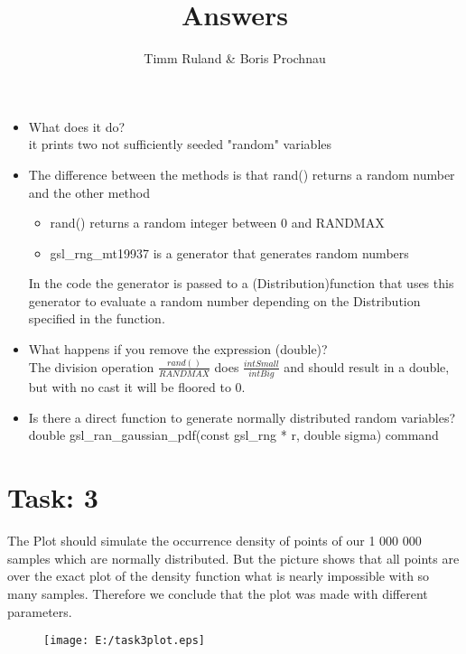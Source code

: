 \documentclass{article}
\title{Answers}
\author{Timm Ruland \& Boris Prochnau}
\begin{document}
\maketitle

\begin{itemize}
\section{Task: 1}	%
	\item What does it do? \\
it prints two not sufficiently seeded "random" variables
	\item The difference between the methods is that rand() returns a random number 
and the other method
  
	\begin{itemize}
		\item rand() returns a random integer between 0 and RANDMAX
		\item gsl\_rng\_mt19937 is a generator that generates random numbers
	\end{itemize}
 In the code the generator is passed to a (Distribution)function that uses this generator 
 to evaluate a random number depending on the Distribution specified in the function.
	\item What happens if you remove the expression (double)?\\
 The division operation $\frac{rand()}{RANDMAX}$ does $\frac{int Small}{int Big}$ and
 should result in a double, but with no cast it will be floored to 0. 
	\item Is there a direct function to generate normally distributed random variables?\\
	double gsl\_ran\_gaussian\_pdf(const gsl\_rng * r, double sigma)
 command
\end{itemize}

\newpage
\section{Task: 3} %
The Plot should simulate the occurrence density of points of our 1 000 000 samples which are normally distributed. But the picture
shows that all points are over the exact plot of the density function what is nearly impossible with so many samples. Therefore 
we conclude that the plot was made with different parameters.
\begin{figure}[h]
	\centering
		\texttt{[image: E:/task3plot.eps]}
	\label{fig:task3plot}
\end{figure}
\end{document}
